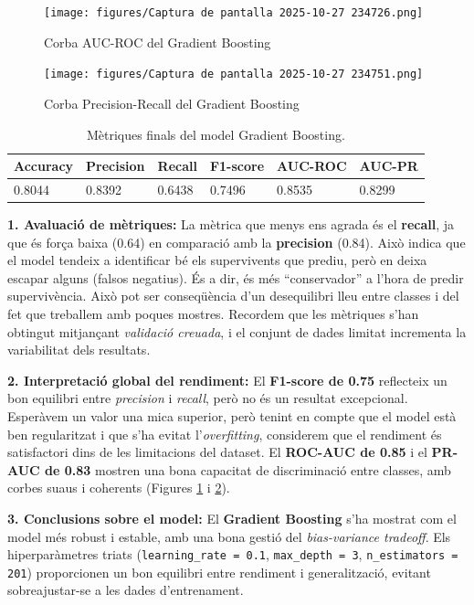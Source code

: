 \documentclass[9pt,a4paper,twoside]{tau-class/tau}
\begin{document}
\begin{figure}[H]
    \centering
    \texttt{[image: figures/Captura de pantalla 2025-10-27 234726.png]}
    \caption{Corba AUC-ROC del Gradient Boosting}
    \label{fig:roc_gb}
\end{figure}

\begin{figure}[H]
    \centering
    \texttt{[image: figures/Captura de pantalla 2025-10-27 234751.png]}
    \caption{Corba Precision-Recall del Gradient Boosting}
    \label{fig:pr_gb}
\end{figure}

\begin{table}[H]
\centering
\scriptsize
\begin{tabular}{|l|l|l|l|l|l|}
\hline
\textbf{Accuracy} & \textbf{Precision} & \textbf{Recall} & \textbf{F1-score} & \textbf{AUC-ROC} & \textbf{AUC-PR} \\
\hline
0.8044 & 0.8392 & 0.6438 & 0.7496 & 0.8535 & 0.8299 \\
\hline
\end{tabular}
\caption{Mètriques finals del model Gradient Boosting.}
\label{tab:metrics_gb}
\end{table}

\textbf{1. Avaluació de mètriques:}
La mètrica que menys ens agrada és el \textbf{recall}, ja que és força baixa (0.64) en comparació amb la \textbf{precision} (0.84). Això indica que el model tendeix a identificar bé els supervivents que prediu, però en deixa escapar alguns (falsos negatius). És a dir, és més “conservador” a l’hora de predir supervivència.
Això pot ser conseqüència d’un desequilibri lleu entre classes i del fet que treballem amb poques mostres. Recordem que les mètriques s’han obtingut mitjançant \textit{validació creuada}, i el conjunt de dades limitat incrementa la variabilitat dels resultats.

\textbf{2. Interpretació global del rendiment:}
El \textbf{F1-score de 0.75} reflecteix un bon equilibri entre \textit{precision} i \textit{recall}, però no és un resultat excepcional. Esperàvem un valor una mica superior, però tenint en compte que el model està ben regularitzat i que s’ha evitat l’\textit{overfitting}, considerem que el rendiment és satisfactori dins de les limitacions del dataset.
El \textbf{ROC-AUC de 0.85} i el \textbf{PR-AUC de 0.83} mostren una bona capacitat de discriminació entre classes, amb corbes suaus i coherents (Figures \ref{fig:roc_gb} i \ref{fig:pr_gb}).

\textbf{3. Conclusions sobre el model:}
El \textbf{Gradient Boosting} s’ha mostrat com el model més robust i estable, amb una bona gestió del \textit{bias-variance tradeoff}. Els hiperparàmetres triats (\texttt{learning\_rate = 0.1}, \texttt{max\_depth = 3}, \texttt{n\_estimators = 201}) proporcionen un bon equilibri entre rendiment i generalització, evitant sobreajustar-se a les dades d’entrenament.
\end{document}
